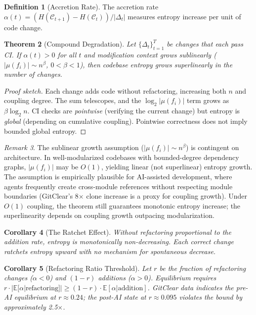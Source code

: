 \documentclass[11pt, a4paper]{article}
\newtheorem{theorem}{Theorem}[section]
\newtheorem{corollary}[theorem]{Corollary}
\theoremstyle{definition}
\newtheorem{definition}[theorem]{Definition}
\theoremstyle{remark}
\newtheorem{remark}[theorem]{Remark}
\begin{document}
\begin{definition}[Accretion Rate]
The accretion rate $\alpha(t) = (H(\mathcal{C}_{t+1}) - H(\mathcal{C}_t)) / |\Delta_t|$ measures entropy increase per unit of code change.
\end{definition}

\begin{theorem}[Compound Degradation]
\label{thm:compound}
Let $\{\Delta_t\}_{t=1}^{T}$ be changes that each pass CI. If $\alpha(t) > 0$ for all $t$ and modification context grows sublinearly ($|\mu(f_i)| \sim n^\beta$, $0 < \beta < 1$), then codebase entropy grows superlinearly in the number of changes.
\end{theorem}

\begin{proof}[Proof sketch]
Each change adds code without refactoring, increasing both $n$ and coupling degree. The sum telescopes, and the $\log_2 |\mu(f_i)|$ term grows as $\beta \log_2 n$. CI checks are \emph{pointwise} (verifying the current change) but entropy is \emph{global} (depending on cumulative coupling). Pointwise correctness does not imply bounded global entropy.
\end{proof}

\begin{remark}
The sublinear growth assumption ($|\mu(f_i)| \sim n^\beta$) is contingent on architecture. In well-modularized codebases with bounded-degree dependency graphs, $|\mu(f_i)|$ may be $O(1)$, yielding linear (not superlinear) entropy growth. The assumption is empirically plausible for AI-assisted development, where agents frequently create cross-module references without respecting module boundaries (GitClear's 8$\times$ clone increase is a proxy for coupling growth). Under $O(1)$ coupling, the theorem still guarantees monotonic entropy increase; the superlinearity depends on coupling growth outpacing modularization.
\end{remark}

\begin{corollary}[The Ratchet Effect]
Without refactoring proportional to the addition rate, entropy is monotonically non-decreasing. Each correct change ratchets entropy upward with no mechanism for spontaneous decrease.
\end{corollary}

\begin{corollary}[Refactoring Ratio Threshold]
\label{cor:refactoring}
Let $r$ be the fraction of refactoring changes ($\alpha < 0$) and $(1-r)$ additions ($\alpha > 0$). Equilibrium requires $r \cdot |\mathbb{E}[\alpha | \text{refactoring}]| \geq (1-r) \cdot \mathbb{E}[\alpha | \text{addition}]$. GitClear data indicates the pre-AI equilibrium at $r \approx 0.24$; the post-AI state at $r \approx 0.095$ violates the bound by approximately 2.5$\times$.
\end{corollary}
\end{document}
